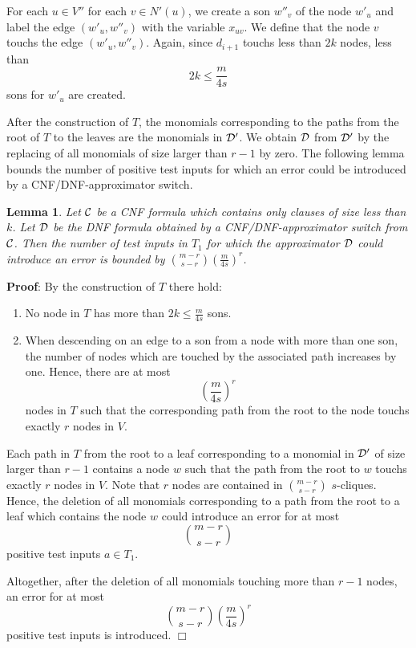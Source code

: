 \documentclass[11pt]{article}
\newtheorem{lem}{Lemma}
\begin{document}
For each $u \in V''$ for each $v \in N'(u)$, we create a son $w''_v$ of the node $w'_u$ and label the edge
$(w'_u,w''_v)$ with the variable $x_{uv}$. We define that the node $v$ touchs the edge $(w'_u,w''_v)$. 
Again, since $d_{i+1}$ touchs less than $2k$ nodes, less than
$$
2k \leq \frac{m}{4s}
$$
sons for $w'_u$ are created.

After the construction of $T$, the monomials corresponding to the paths from the root of $T$ to the leaves are the
monomials in ${\cal D}'$. We obtain ${\cal D}$ from ${\cal D}'$ by the replacing of all monomials of size larger than
$r-1$ by zero.
The following lemma bounds the number of positive test inputs for which an error could be introduced by a
CNF/DNF-approximator switch.
\begin{lem} \label{lem4.1}
  Let ${\cal C}$ be a CNF formula which contains only clauses of size less than $k$. Let ${\cal D}$ be the DNF
  formula obtained by a CNF/DNF-approximator switch from ${\cal C}$. Then the number of test inputs in $T_1$
  for which the approximator ${\cal D}$ could introduce an error is bounded by
  ${m - r \choose s - r}(\frac{m}{4s})^{r}$.
\end{lem}
{\bf Proof}:
 By the construction of $T$ there hold:
\begin{enumerate}
\item
  No node in $T$ has more than $2k \leq \frac{m}{4s}$ sons.
\item
  When descending on an edge to a son from a node with more than one son, the number of nodes which are touched
  by the associated path increases by one. Hence, there are at most
  $$
  \left(\frac{m}{4s}\right)^{r}
  $$
  nodes in $T$ such that the corresponding path from the root to the node touchs exactly $r$ nodes in $V$.
\end{enumerate}

Each path in $T$ from the root to a leaf corresponding to a monomial in ${\cal D}'$ of size larger than $r-1$
contains a node $w$ such that the path from the root to $w$ touchs exactly $r$ nodes in $V$. Note that $r$ nodes
are contained in ${m - r \choose s - r}$ $s$-cliques.
Hence, the deletion of all monomials corresponding to a path from the root to a leaf which contains the node $w$
could introduce an error for at most
$$
{m - r \choose s - r}
$$
positive test inputs $a \in T_1$.

Altogether, after the deletion of all monomials touching more than $r-1$ nodes, an error for at most
$$
{m - r \choose s - r}\left(\frac{m}{4s}\right)^{r}
$$
positive test inputs is introduced.
$\Box$
\end{document}

